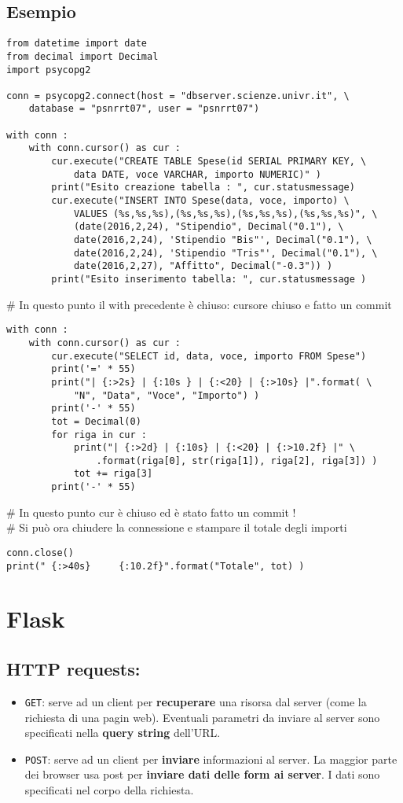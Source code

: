 \documentclass[a4paper, 10pt, titlepage]{article}
\begin{document}
	\subsection{Esempio}
	\begin{lstlisting}
from datetime import date
from decimal import Decimal
import psycopg2

conn = psycopg2.connect(host = "dbserver.scienze.univr.it", \
	database = "psnrrt07", user = "psnrrt07")

with conn :
	with conn.cursor() as cur :
		cur.execute("CREATE TABLE Spese(id SERIAL PRIMARY KEY, \
			data DATE, voce VARCHAR, importo NUMERIC)" )
		print("Esito creazione tabella : ", cur.statusmessage)
		cur.execute("INSERT INTO Spese(data, voce, importo) \
			VALUES (%s,%s,%s),(%s,%s,%s),(%s,%s,%s),(%s,%s,%s)", \
			(date(2016,2,24), "Stipendio", Decimal("0.1"), \
			date(2016,2,24), 'Stipendio "Bis"', Decimal("0.1"), \
			date(2016,2,24), 'Stipendio "Tris"', Decimal("0.1"), \
			date(2016,2,27), "Affitto", Decimal("-0.3")) )
		print("Esito inserimento tabella: ", cur.statusmessage )
	\end{lstlisting}	
\# In questo punto il with precedente è chiuso: cursore chiuso e fatto un commit
	\begin{lstlisting}
with conn :
	with conn.cursor() as cur : 
		cur.execute("SELECT id, data, voce, importo FROM Spese")
		print('=' * 55)
		print("| {:>2s} | {:10s } | {:<20} | {:>10s} |".format( \
			"N", "Data", "Voce", "Importo") )
		print('-' * 55)
		tot = Decimal(0)
		for riga in cur :
			print("| {:>2d} | {:10s} | {:<20} | {:>10.2f} |" \
				.format(riga[0], str(riga[1]), riga[2], riga[3]) )
			tot += riga[3]
		print('-' * 55)
		\end{lstlisting}
\# In questo punto cur è chiuso ed è stato fatto un commit !  \\
\# Si può ora chiudere la connessione e stampare il totale degli importi
	\begin{lstlisting}
conn.close()
print(" {:>40s}		{:10.2f}".format("Totale", tot) )
	\end{lstlisting}	
	\newpage
	
			
		
	\section{Flask}
	\lstset{language=Python}
		\subsection{HTTP requests:}
			\begin{itemize}
				\item \lstinline|GET|: serve ad un client per \textbf{recuperare} una risorsa dal server (come la richiesta di una pagin web). Eventuali parametri da inviare al server sono specificati nella \textbf{query string} dell'URL.
				\item \lstinline|POST|: serve ad un client per \textbf{inviare} informazioni al server. La maggior parte dei browser usa post per \textbf{inviare dati delle form ai server}. I dati sono specificati nel corpo della richiesta.
			\end{itemize}
\end{document}
